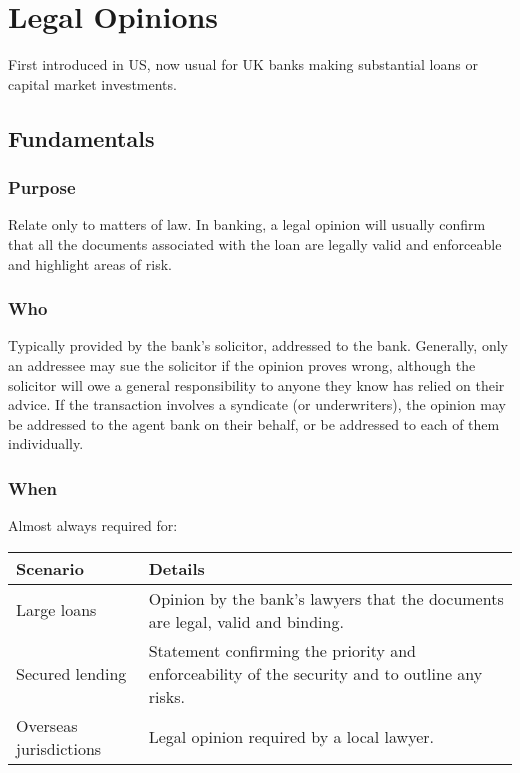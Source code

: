 \documentclass[
]{article}
\begin{document}
\hypertarget{legal-opinions}{%
\section{Legal Opinions}\label{legal-opinions}}

First introduced in US, now usual for UK banks making substantial loans
or capital market investments.

\hypertarget{fundamentals}{%
\subsection{Fundamentals}\label{fundamentals}}

\hypertarget{purpose-1}{%
\subsubsection{Purpose}\label{purpose-1}}

Relate only to matters of law. In banking, a legal opinion will usually
confirm that all the documents associated with the loan are legally
valid and enforceable and highlight areas of risk.

\hypertarget{who}{%
\subsubsection{Who}\label{who}}

Typically provided by the bank's solicitor, addressed to the bank.
Generally, only an addressee may sue the solicitor if the opinion proves
wrong, although the solicitor will owe a general responsibility to
anyone they know has relied on their advice. If the transaction involves
a syndicate (or underwriters), the opinion may be addressed to the agent
bank on their behalf, or be addressed to each of them individually.

\hypertarget{when}{%
\subsubsection{When}\label{when}}

Almost always required for:

\begin{longtable}[]{@{}ll@{}}
\toprule()
Scenario & Details \\
\midrule()
\endhead
Large loans & Opinion by the bank's lawyers that the documents are
legal, valid and binding. \\
Secured lending & Statement confirming the priority and enforceability
of the security and to outline any risks. \\
Overseas jurisdictions & Legal opinion required by a local lawyer. \\
\bottomrule()
\end{longtable}
\end{document}
